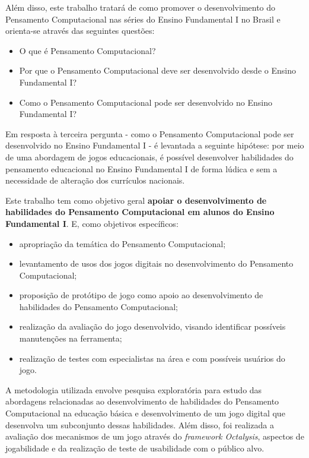 Além disso, este trabalho tratará de como promover o desenvolvimento do Pensamento Computacional nas séries do Ensino Fundamental I no Brasil e orienta-se através das seguintes questões: 

\begin{itemize}
\item O que é Pensamento Computacional?
\item Por que o Pensamento Computacional deve ser desenvolvido desde o Ensino Fundamental I?
\item Como o Pensamento Computacional pode ser desenvolvido no Ensino Fundamental I?
\end{itemize}

Em resposta à terceira pergunta - como o Pensamento Computacional pode ser desenvolvido no Ensino Fundamental I - é levantada a seguinte hipótese: por meio de uma abordagem de jogos educacionais, é possível desenvolver habilidades do pensamento educacional no Ensino Fundamental I de forma lúdica e sem a necessidade de alteração dos currículos nacionais.

Este trabalho tem como objetivo geral \textbf{apoiar o desenvolvimento de habilidades do Pensamento Computacional em alunos do Ensino Fundamental I}. E, como objetivos específicos:

\begin{itemize}
	\item apropriação da temática do Pensamento Computacional;
	\item levantamento de usos dos jogos digitais no desenvolvimento do Pensamento Computacional;
	\item proposição de protótipo de jogo como apoio ao desenvolvimento de habilidades do Pensamento Computacional;
	\item realização da avaliação do jogo desenvolvido, visando identificar possíveis manutenções na ferramenta;
	\item realização de testes com especialistas na área e com possíveis usuários do jogo.
\end{itemize}

A metodologia utilizada envolve pesquisa exploratória para estudo das abordagens relacionadas ao desenvolvimento de habilidades do Pensamento Computacional na educação básica e desenvolvimento de um jogo digital que desenvolva um subconjunto dessas habilidades. Além disso, foi realizada a avaliação dos mecanismos de um jogo através do \textit{framework Octalysis}, aspectos de jogabilidade e da realização de teste de usabilidade com o público alvo.


